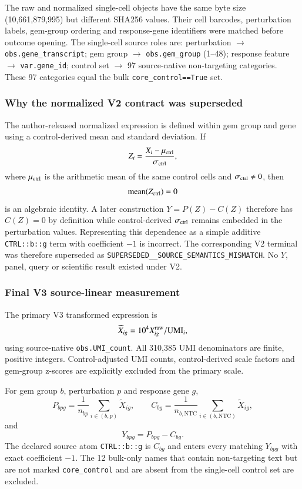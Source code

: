 \documentclass[11pt]{article}
\begin{document}
The raw and normalized single-cell objects have the same byte size (10,661,879,995) but different SHA256 values. Their cell barcodes, perturbation labels, gem-group ordering and response-gene identifiers were matched before outcome opening. The single-cell source roles are: perturbation $\rightarrow$ \texttt{obs.gene\_transcript}; gem group $\rightarrow$ \texttt{obs.gem\_group} (1--48); response feature $\rightarrow$ \texttt{var.gene\_id}; control set $\rightarrow$ 97 source-native non-targeting categories. These 97 categories equal the bulk \texttt{core\_control==True} set.

\subsubsection{Why the normalized V2 contract was superseded}
The author-released normalized expression is defined within gem group and gene using a control-derived mean and standard deviation. If
\[
Z_i=\frac{X_i-\mu_{\rm ctrl}}{\sigma_{\rm ctrl}},
\]
where $\mu_{\rm ctrl}$ is the arithmetic mean of the same control cells and $\sigma_{\rm ctrl}\ne0$, then
\[
\operatorname{mean}(Z_{\rm ctrl})=0
\]
is an algebraic identity. A later construction $Y=P(Z)-C(Z)$ therefore has $C(Z)=0$ by definition while control-derived $\sigma_{\rm ctrl}$ remains embedded in the perturbation values. Representing this dependence as a simple additive \texttt{CTRL::b::g} term with coefficient $-1$ is incorrect. The corresponding V2 terminal was therefore superseded as \texttt{SUPERSEDED\_\_SOURCE\_SEMANTICS\_MISMATCH}. No $Y$, panel, query or scientific result existed under V2.

\subsubsection{Final V3 source-linear measurement}
The primary V3 transformed expression is
\[
\widetilde X_{ig}=10^4 X^{\rm raw}_{ig}/\mathrm{UMI}_i,
\]
using source-native \texttt{obs.UMI\_count}. All 310,385 UMI denominators are finite, positive integers. Control-adjusted UMI counts, control-derived scale factors and gem-group z-scores are explicitly excluded from the primary scale.

For gem group $b$, perturbation $p$ and response gene $g$,
\[
P_{bpg}=\frac{1}{n_{bp}}\sum_{i\in(b,p)}\widetilde X_{ig},\qquad
C_{bg}=\frac{1}{n_{b,\mathrm{NTC}}}\sum_{i\in(b,\mathrm{NTC})}\widetilde X_{ig},
\]
and
\[
Y_{bpg}=P_{bpg}-C_{bg}.
\]
The declared source atom \texttt{CTRL::b::g} is $C_{bg}$ and enters every matching $Y_{bpg}$ with exact coefficient $-1$. The 12 bulk-only names that contain non-targeting text but are not marked \texttt{core\_control} and are absent from the single-cell control set are excluded.
\end{document}
